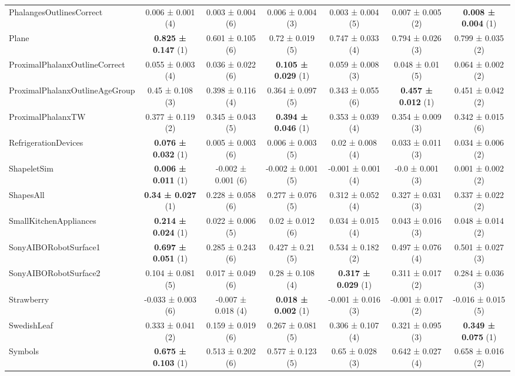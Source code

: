 \begin{table}[ht]
\begin{adjustbox}{width=\textwidth}
\begin{tabular}{lcccccc}
    PhalangesOutlinesCorrect & 0.006 ± 0.001 (4) & 0.003 ± 0.004 (6) & 0.006 ± 0.004 (3) & 0.003 ± 0.004 (5) & 0.007 ± 0.005 (2) & \textbf{0.008 ± 0.004} (1) \\
    Plane & \textbf{0.825 ± 0.147} (1) & 0.601 ± 0.105 (6) & 0.72 ± 0.019 (5) & 0.747 ± 0.033 (4) & 0.794 ± 0.026 (3) & 0.799 ± 0.035 (2) \\
    ProximalPhalanxOutlineCorrect & 0.055 ± 0.003 (4) & 0.036 ± 0.022 (6) & \textbf{0.105 ± 0.029} (1) & 0.059 ± 0.008 (3) & 0.048 ± 0.01 (5) & 0.064 ± 0.002 (2) \\
    ProximalPhalanxOutlineAgeGroup & 0.45 ± 0.108 (3) & 0.398 ± 0.116 (4) & 0.364 ± 0.097 (5) & 0.343 ± 0.055 (6) & \textbf{0.457 ± 0.012} (1) & 0.451 ± 0.042 (2) \\
    ProximalPhalanxTW & 0.377 ± 0.119 (2) & 0.345 ± 0.043 (5) & \textbf{0.394 ± 0.046} (1) & 0.353 ± 0.039 (4) & 0.354 ± 0.009 (3) & 0.342 ± 0.015 (6) \\
    RefrigerationDevices & \textbf{0.076 ± 0.032} (1) & 0.005 ± 0.003 (6) & 0.006 ± 0.003 (5) & 0.02 ± 0.008 (4) & 0.033 ± 0.011 (3) & 0.034 ± 0.006 (2) \\
    ShapeletSim & \textbf{0.006 ± 0.011} (1) & -0.002 ± 0.001 (6) & -0.002 ± 0.001 (5) & -0.001 ± 0.001 (4) & -0.0 ± 0.001 (3) & 0.001 ± 0.002 (2) \\
    ShapesAll & \textbf{0.34 ± 0.027} (1) & 0.228 ± 0.058 (6) & 0.277 ± 0.076 (5) & 0.312 ± 0.052 (4) & 0.327 ± 0.031 (3) & 0.337 ± 0.022 (2) \\
    SmallKitchenAppliances & \textbf{0.214 ± 0.024} (1) & 0.022 ± 0.006 (5) & 0.02 ± 0.012 (6) & 0.034 ± 0.015 (4) & 0.043 ± 0.016 (3) & 0.048 ± 0.014 (2) \\
    SonyAIBORobotSurface1 & \textbf{0.697 ± 0.051} (1) & 0.285 ± 0.243 (6) & 0.427 ± 0.21 (5) & 0.534 ± 0.182 (2) & 0.497 ± 0.076 (4) & 0.501 ± 0.027 (3) \\
    SonyAIBORobotSurface2 & 0.104 ± 0.081 (5) & 0.017 ± 0.049 (6) & 0.28 ± 0.108 (4) & \textbf{0.317 ± 0.029} (1) & 0.311 ± 0.017 (2) & 0.284 ± 0.036 (3) \\
    Strawberry & -0.033 ± 0.003 (6) & -0.007 ± 0.018 (4) & \textbf{0.018 ± 0.002} (1) & -0.001 ± 0.016 (3) & -0.001 ± 0.017 (2) & -0.016 ± 0.015 (5) \\
    SwedishLeaf & 0.333 ± 0.041 (2) & 0.159 ± 0.019 (6) & 0.267 ± 0.081 (5) & 0.306 ± 0.107 (4) & 0.321 ± 0.095 (3) & \textbf{0.349 ± 0.075} (1) \\
    Symbols & \textbf{0.675 ± 0.103} (1) & 0.513 ± 0.202 (6) & 0.577 ± 0.123 (5) & 0.65 ± 0.028 (3) & 0.642 ± 0.027 (4) & 0.658 ± 0.016 (2) \\

\end{tabular}
\end{adjustbox}
\end{table}
